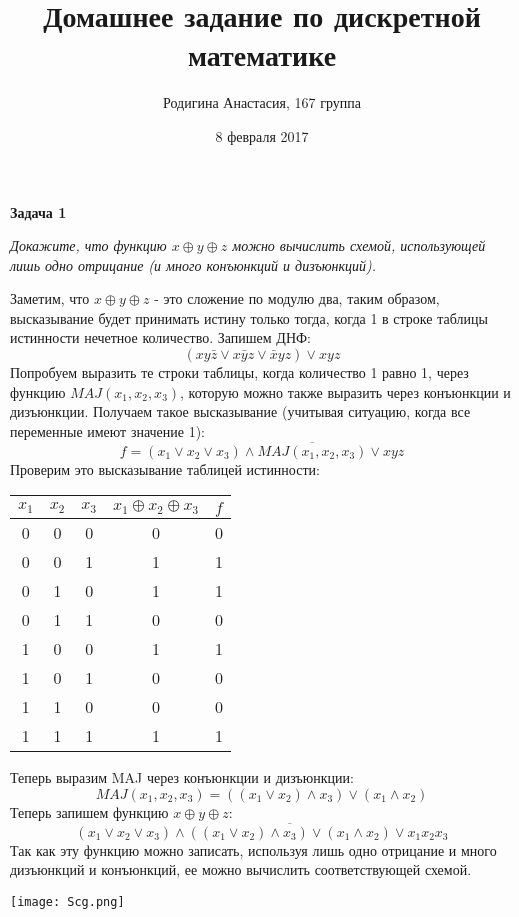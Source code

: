 \documentclass{article}
\title{Домашнее задание по дискретной математике}
\author{Родигина Анастасия, 167 группа}
\date{8 февраля 2017}
\begin{document}
            

\maketitle  
 \noindent \textbf{Задача 1}
\begin{center} 
\textit{Докажите, что функцию $x \oplus y \oplus z$ можно вычислить схемой, использующей лишь одно отрицание (и много конъюнкций и дизъюнкций).}
\end{center}
Заметим, что $x \oplus y \oplus z$ - это сложение по модулю два, таким образом, высказывание будет принимать истину только тогда, когда 1 в строке таблицы истинности нечетное количество. 
Запишем ДНФ:
$$(xy\bar{z} \vee x\bar{y}z \vee \bar{x}yz) \vee xyz$$
Попробуем выразить те строки таблицы, когда количество 1 равно 1, через функцию $MAJ(x_1,x_2,x_3)$, которую можно также выразить через конъюнкции и дизъюнкции. 
Получаем такое высказывание (учитывая ситуацию, когда все переменные имеют значение 1):
$$f = (x_1\vee x_2 \vee x_3)\wedge \overline{MAJ(x_1,x_2,x_3)}\vee xyz$$
Проверим это высказывание таблицей истинности:
\begin{center}
\begin{tabular}{|c|c|c|c|c|}
\hline
$x_1$ & $x_2$ & $x_3$ & $x_1 \oplus x_2 \oplus x_3$ & $f$  \\
\hline
0  & 0 & 0 & 0 & 0 \\
\hline
0  & 0 & 1 & 1 & 1  \\
\hline
0  & 1 & 0 & 1 & 1 \\
\hline
0  & 1 & 1 & 0 & 0 \\
\hline
1  & 0 & 0 & 1 & 1 \\
\hline
1  & 0 & 1 & 0 & 0 \\
\hline
1  & 1 & 0 & 0 & 0 \\
\hline
1  & 1 & 1 & 1 & 1 \\
\hline

\end{tabular}
\end{center}
Теперь выразим MAJ через конъюнкции и дизъюнкции:
$$MAJ(x_1,x_2,x_3) = ((x_1\vee x_2)\wedge x_3) \vee (x_1\wedge x_2)$$
Теперь запишем функцию $x \oplus y \oplus z$:
$$(x_1\vee x_2 \vee x_3)\wedge \overline{((x_1\vee x_2)\wedge x_3) \vee (x_1\wedge x_2)}\vee x_1 x_2 x_3$$
Так как эту функцию можно записать, используя лишь одно отрицание и много дизъюнкций и конъюнкций, ее можно вычислить соответствующей схемой.
 \begin{center} 
 \texttt{[image: Scg.png]}
 \end{center}
\end{document}
